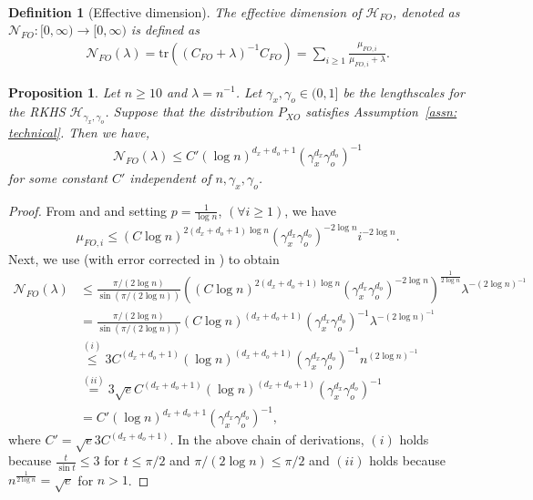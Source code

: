 \documentclass[11pt]{article}
\newcommand{\calH}{\mathcal{H}}
\newcommand{\calN}{\mathcal{N}}
\newcommand{\0}{\mathbf{0}}
\newtheorem{defi}{Definition}
\newtheorem{prop}{Proposition}[section]
\begin{document}
\begin{appendix}
\begin{align}
\end{align}
\begin{defi}[Effective dimension]
The effective dimension of $\calH_{FO}$, denoted as $\calN_{FO} : [0,\infty)\to [0,\infty)$ is  defined as 
    \begin{align*}
        \calN_{FO}(\lambda) = \mathrm{tr}\left((C_{FO}+\lambda)^{-1}C_{FO}\right) = \sum_{i\geq 1}\frac{\mu_{FO,i}}{\mu_{FO,i} + \lambda} .
    \end{align*}
\end{defi}
\begin{prop}
\label{prop:eff_dim}
Let $n\geq 10$ and $\lambda=n^{-1}$. Let $\gamma_x,\gamma_o\in (0,1]$ be the lengthscales for the RKHS $\calH_{\gamma_x,\gamma_o}$. Suppose that the distribution $P_{XO}$ satisfies Assumption~\ref{assn: technical}. Then we have,
    \begin{align*}
        \mathcal{N}_{FO}(\lambda) \leq C'(\log n)^{d_x+d_o+1} \left(\gamma_x^{d_x}\gamma_o^{d_o}\right)^{-1}
    \end{align*}
    for some constant $C'$ independent of $n, \gamma_x,\gamma_o$.
\end{prop}
\begin{proof}
From  and  and setting $p = \frac{1}{\log n}$, $(\forall i\geq 1)$, we have 
\begin{align*}
    \mu_{FO,i} \leq (C \log n)^{2(d_x+d_o+1) \log n}(\gamma_x^{d_x}\gamma_o^{d_o})^{-2\log n} i^{-2\log n}.
\end{align*}
Next, we use \cite[Proposition 3]{caponnetto2007optimal} (with error corrected in \cite{sutherland2021fixingerrorcaponnettovito}) to obtain
\begin{align}
    \mathcal{N}_{FO}(\lambda) &\leq \frac{\pi/(2\log n)}{\sin(\pi/(2\log n))}\left( (C \log n)^{2(d_x+d_o+1) \log n}(\gamma_x^{d_x}\gamma_o^{d_o})^{-2\log n} \right)^{\frac{1}{2\log n}}\lambda^{-(2\log n)^{-1}}\nonumber\\
    &= \frac{\pi/(2\log n)}{\sin(\pi/(2\log n))} (C\log n)^{(d_x+d_o+1)} \left(\gamma_x^{d_x}\gamma_o^{d_o}\right)^{-1}\lambda^{-(2\log n)^{-1}}\nonumber\\
    &\stackrel{(i)}{\leq} 3C^{(d_x+d_o+1)} (\log n)^{(d_x+d_o+1)} 
    \left(\gamma_x^{d_x}\gamma_o^{d_o}\right)^{-1}n^{(2\log n)^{-1}}\nonumber\\
    &\stackrel{(ii)}{=} 3\sqrt{e} C^{(d_x+d_o+1)} (\log n)^{(d_x+d_o+1)} \left(\gamma_x^{d_x}\gamma_o^{d_o}\right)^{-1}\nonumber\\
    &= C'(\log n)^{d_x+d_o + 1} \left(\gamma_x^{d_x}\gamma_o^{d_o}\right)^{-1}\nonumber,
\end{align}
where $C' = \sqrt{e} 3C^{(d_x+d_o+1)}$. 
In the above chain of derivations, $(i)$ holds because $\frac{t}{\sin t} \leq 3$ for $t \leq \pi/2$ and $\pi/(2\log n) \leq \pi/2$ and $(ii)$ holds because $n^{\frac{1}{2\log n}} = \sqrt{e}$ for $n > 1$. 
\end{proof}


\end{appendix}
\end{document}
